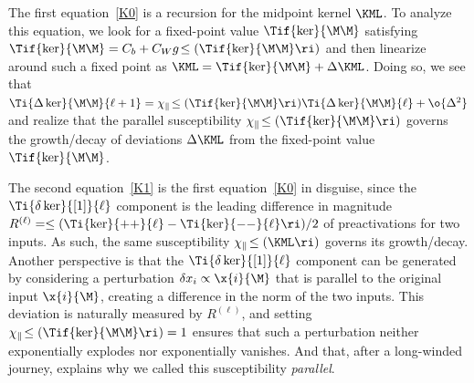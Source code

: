 The first equation~\eqref{K0} is a recursion for the midpoint kernel $\KML$. %
To analyze this equation, we look for a fixed-point value $\Tif{\ker}{\M\M}$ satisfying $\Tif{\ker}{\M\M}=C_b + C_W g\!\le(\Tif{\ker}{\M\M}\ri)$ and then linearize around such a fixed point as $\KML=\Tif{\ker}{\M\M}+\Delta \KML$. Doing so, we see that $\Ti{\Delta \ker}{\M\M}{\ell+1}=\chi_{\parallel}\!\le(\Tif{\ker}{\M\M}\ri)\Ti{\Delta \ker}{\M\M}{\ell}+\o{\Delta^2}$ and realize that the parallel susceptibility $\chi_{\parallel}\!\le(\Tif{\ker}{\M\M}\ri)$ governs the growth/decay of deviations $\Delta \KML$ from the fixed-point value $\Tif{\ker}{\M\M}$.

The second equation~\eqref{K1} is the first equation~\eqref{K0} in disguise, since the $\Ti{\delta \ker}{[1]}{\ell}$ component is the leading difference in magnitude $R^{(\ell)}=\le(\Ti{\ker}{++}{\ell}-\Ti{\ker}{--}{\ell}\ri)/2$ of preactivations for two inputs. As such, the same susceptibility $\chi_{\parallel}\!\le(\KML\ri)$ governs its growth/decay. Another perspective is that the $\Ti{\delta \ker}{[1]}{\ell}$ component can be generated by considering a perturbation $\delta x_i \propto \x{i}{\M}$ that is parallel to the original input $\x{i}{\M}$, creating a difference in the norm of the two inputs. This deviation is naturally measured by $R^{(\ell)}$, and setting $\chi_\parallel\!\le(\Tif{\ker}{\M\M} \ri) = 1$ ensures that such a perturbation neither exponentially explodes nor exponentially vanishes. And that, after a long-winded journey, explains why we called this susceptibility \emph{parallel}.


